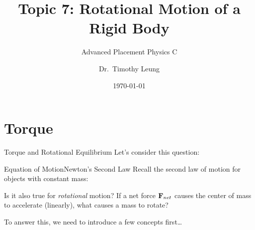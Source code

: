 \documentclass[12pt,compress,aspectratio=169]{beamer}
\title{Topic 7: Rotational Motion of a Rigid Body}
\subtitle{Advanced Placement Physics C}
\author[TML]{Dr.\ Timothy Leung}
\institute{Olympiads School}
\date{\today}
\newcommand{\mb}[1]{\ensuremath\mathbf{#1}}
\newcommand{\eq}[2]{\vspace{#1}{\Large\begin{displaymath}#2\end{displaymath}}}
\begin{document}
\begin{frame}
  \maketitle
\end{frame}





\section{Torque}

\begin{frame}{Torque and Rotational Equilibrium}
  Let's consider this question:
  \begin{center}
  \end{center}
\end{frame}



\begin{frame}{Equation of Motion}{Newton's Second Law}
  Recall the second law of motion for objects with constant mass:
    
  \eq{-.2in}{
    \mb{F}_{net}=m\mb{a}
  }

  \vspace{-.1in}Is it also true for \emph{rotational} motion? If a net force
  $\mb{F}_{net}$ causes the center of mass to accelerate (linearly), what
  causes a mass to rotate?

  \vspace{.3in}To answer this, we need to introduce a few concepts first\ldots
\end{frame}
\end{document}
